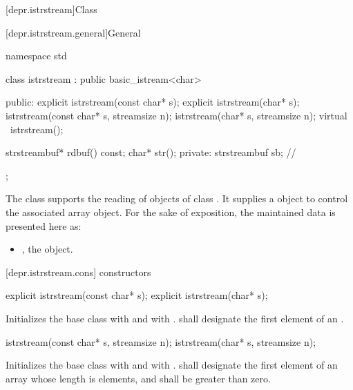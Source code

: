 [depr.istrstream]{Class }

[depr.istrstream.general]{General}

%
\begin{codeblock}
namespace std {
  class istrstream : public basic_istream<char> {
  public:
    explicit istrstream(const char* s);
    explicit istrstream(char* s);
    istrstream(const char* s, streamsize n);
    istrstream(char* s, streamsize n);
    virtual ~istrstream();

    strstreambuf* rdbuf() const;
    char* str();
  private:
    strstreambuf sb;            // \expos
  };
}
\end{codeblock}

\pnum
The class
supports the reading of objects of class
.
It supplies a
object to control the associated array object.
For the sake of exposition, the maintained data is presented here as:
\begin{itemize}
\item
{}, the  object.
\end{itemize}

[depr.istrstream.cons]{ constructors}

%
\begin{itemdecl}
explicit istrstream(const char* s);
explicit istrstream(char* s);
\end{itemdecl}

\begin{itemdescr}
\pnum
\effects
Initializes the base class with  and
 with .
 shall designate the first element of an \ntbs{}.%
\end{itemdescr}

%
\begin{itemdecl}
istrstream(const char* s, streamsize n);
istrstream(char* s, streamsize n);
\end{itemdecl}

\begin{itemdescr}
\pnum
\effects
Initializes the base class with 
and  with .
 shall designate the first element of an array whose length is
 elements, and  shall be greater than zero.
\end{itemdescr}

